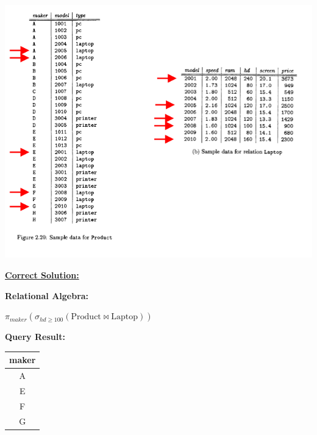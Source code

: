 \documentclass[12pt]{article}
\begin{document}
\begin{enumerate}
\begin{enumerate}[a)]
        \begin{center}
        \includegraphics[width=\linewidth]{images/worksheet_2_solution_7.png}
        \end{center}

        \bigskip

        \begin{mdframed}
            \underline{\textbf{Correct Solution:}}

            \bigskip

            \color{red}

            \textbf{Relational Algebra:}

            \bigskip

            \color{black}

            $\pi_{maker}(\sigma_{hd \geq 100}(\text{Product} \bowtie \text{Laptop}))$

            \color{red}

            \bigskip

            \textbf{Query Result:}

            \bigskip

            \begin{tabular}{|c|}
                \hline
                maker\\
                \hline
                A\\
                \hline
                E\\
                \hline
                F\\
                \hline
                G\\
                \hline
            \end{tabular}
            \color{black}


\end{mdframed}
\end{enumerate}
\end{enumerate}
\end{document}
